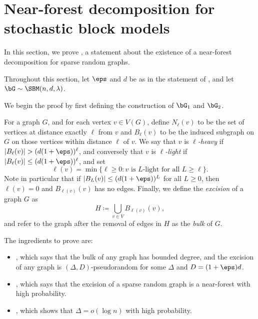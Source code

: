 \documentclass[11pt,letterpaper]{article}
\begin{document}


\section{Near-forest decomposition for stochastic block models}
\label{sec:extinction}
In this section, we prove , a statement about the existence of a near-forest decomposition for sparse random graphs.
\randomgraphdecomp*
\begin{notation*}[$\eps,\, d,\, \bG$]
Throughout this section, let $\eps$ and $d$ be as in the statement of , and let $\bG\sim\SBM(n, d, \lambda)$.
\end{notation*}

We begin the proof by first defining the construction of $\bG_1$ and $\bG_2$.

\begin{definition}
    For a graph $G$, and for each vertex $v\in V(G)$, define $N_\ell(v)$ to be the set of vertices at distance exactly $\ell$ from $v$ and $B_\ell(v)$ to be the induced subgraph on $G$ on those vertices within distance $\ell$ of $v$. 
    We say that $v$ is \emph{$\ell$-heavy} if $|B_\ell(v)| > (d(1+\eps))^\ell$, and conversely that $v$ is \emph{$\ell$-light} if $|B_{\ell}(v)| \le (d(1+\eps))^{\ell}$, and set
    \[
        \ell(v) = \min\{ \ell \ge 0 : v \text{ is $L$-light for all $L \ge \ell$} \}.
    \]
    Note in particular that if $|B_L(v)| \le (d(1+\eps))^L$ for all $L \ge 0$, then $\ell(v) = 0$ and $B_{\ell(v)}(v)$ has no edges.
    Finally, we define the \emph{excision} of a graph $G$ as
    \[
        H \coloneqq \bigcup_{v \in V} B_{\ell(v)}(v),
    \]
    and refer to the graph after the removal of edges in $H$ as the \emph{bulk} of $G$.
\end{definition}

The ingredients to prove  are:
\begin{itemize}
    \item {}, which says that the bulk of any graph has bounded degree, and the excision of any graph is $(\Delta, D)$-pseudorandom for some $\Delta$ and $D = (1+\eps)d$.
    \item {}, which says that the excision of a sparse random graph is a near-forest with high probability.
    \item {}, which shows that $\Delta = o(\log n)$ with high probability.
\end{itemize}
\end{document}
